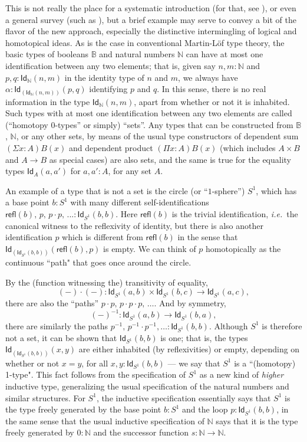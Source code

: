 \documentclass[11pt]{article}
\newcommand{\B}{\ensuremath{\mathbb{B}}}
\newcommand{\N}{\ensuremath{\mathbb{N}}}
\newcommand{\Id}{\mathsf{Id}}
\newcommand{\id}[1]{\Id_{#1}}
\newcommand{\refl}{\mathsf{refl}}
\theoremstyle{remark}
\theoremstyle{definition}
\begin{document}
This is not really the place for a systematic introduction (for that, see \cite{HoTTbook}), or even a general survey
(such as \cite{apw,pw}), but a brief example may serve to convey a bit of the flavor of the new approach, especially the
distinctive intermingling of logical and homotopical ideas.  As is the case in conventional Martin-L\"of type theory,
the basic types of booleans $\B$ and natural numbers $\N$ can have at most one identification between any two elements;
that is, given say $n, m : \N$ and $p,q: \id{\N}(n,m)$ in the identity type of $n$ and $m$, we always have
$\alpha:\id{\left(\id{\N}(n,m)\right)}(p,q)$ identifying $p$ and $q$.  In this sense, there is no real information in
the type $\id{\N}(n,m)$, apart from whether or not it is inhabited.  Such types with at most one identification between
any two elements are called (``homotopy 0-types'' or simply) ``sets''.  Any types that can be constructed from $\B$,
$\N$, or any other sets, by means of the usual type constructors of dependent sum $(\Sigma{x:A})B(x)$ and dependent
product $(\Pi{x:A})B(x)$ (which includes $A\times B$ and $A\rightarrow B$ as special cases) are also sets, and the same
is true for the equality types $\id{A}(a,a')$ for $a,a':A$, for any set $A$.

 An example of a type that is not a set is the circle (or ``$1$-sphere'') $S^1$, which has a base point $b: S^1$ with many different self-identifications $\refl(b),\, p,\, p\cdot p,\, ... :\id{S^1}(b,b)$.  Here $\refl(b)$ is the trivial identification, \textit{i.e.}\ the canonical witness to the reflexivity of identity, but there is also another identification $p$ which is different from $\refl(b)$ in the sense that $\id{\left(\id{S^1}(b,b)\right)}(\refl(b), p)$ is empty.  We can think of $p$ homotopically as the continuous ``path" that goes once around the circle. 

%
%

By the (function witnessing the) transitivity of equality, 
\[
(-)\cdot(-) : \id{S^1}(a,b) \times \id{S^1}(b,c)\to \id{S^1}(a,c),
\]
 there are also the ``paths'' $p\cdot p,\, p\cdot p\cdot p,\, \ldots$.   And by symmetry,
 \[
 (-)^{-1}:\id{S^1}(a,b) \to \id{S^1}(b,a),
 \]
 there are similarly the paths $p^{-1},\, p^{-1}\cdot p^{-1}, \ldots :\id{S^1}(b,b)$.  Although $S^1$ is therefore not a set, it can be shown that $\id{S^1}(b,b)$ is one; that is, the types $\id{\left(\id{S^1}(b,b)\right)}(x,y)$ are either inhabited (by reflexivities) or empty, depending on whether or not $x=y$, for all $x,y : \id{S^1}(b,b)$ --- we say that $S^1$ is a ``(homotopy) 1-type".  This fact follows from the specification of $S^1$ as a new kind of \emph{higher} inductive type, generalizing the usual specification of the natural numbers and similar structures.  For $S^1$, the inductive specification essentially says that $S^1$ is the type freely generated by the base point $b:S^1$ and the loop $p:\id{S^1}(b,b)$, in the same sense that the usual inductive specification of $\N$ says that it is the type freely generated by $0:\N$ and the successor function $s:\N\to\N$.  
  
\end{document}
